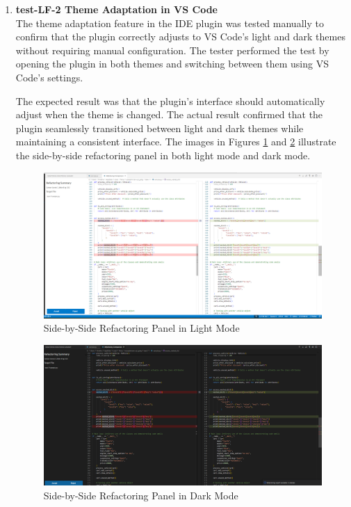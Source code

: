 \documentclass[12pt, titlepage]{article}
\begin{document}
\begin{enumerate}
  \item \textbf{test-LF-2 Theme Adaptation in VS Code} \\[2mm]
    The theme adaptation feature in the IDE plugin was tested
    manually to confirm that the plugin correctly adjusts to VS
    Code’s light and dark themes without requiring manual
    configuration. The tester performed the test by opening the
    plugin in both themes and switching between them using VS Code’s settings.

    The expected result was that the plugin’s interface should
    automatically adjust when the theme is changed. The actual result
    confirmed that the plugin seamlessly transitioned between light
    and dark themes while maintaining a consistent interface. The
    images in Figures \ref{fig:lf2_light} and \ref{fig:lf2_dark}
    illustrate the side-by-side refactoring panel in both light mode
    and dark mode.

    \FloatBarrier
    \begin{figure}[h]
      \centering
      \includegraphics[width=0.8\linewidth]{../Images/test-LF-2-image-light.png}
      \caption{Side-by-Side Refactoring Panel in Light Mode}
      \label{fig:lf2_light}
    \end{figure}
    \FloatBarrier

    \FloatBarrier
    \begin{figure}[h]
      \centering
      \includegraphics[width=0.8\linewidth]{../Images/test-LF-2-image-dark.png}
      \caption{Side-by-Side Refactoring Panel in Dark Mode}
      \label{fig:lf2_dark}
    \end{figure}
    \FloatBarrier


\end{enumerate}
\end{document}
